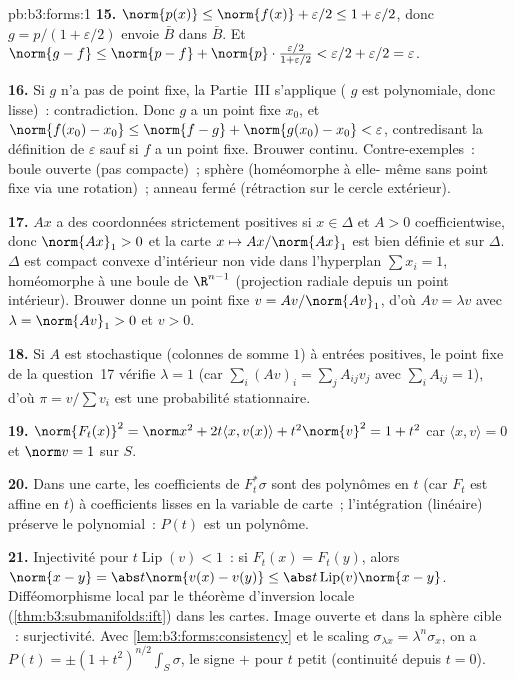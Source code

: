 \begin{solution}{pb:b3:forms:1}
\textbf{15.} $\norm{p(x)} \leq \norm{f(x)} + \varepsilon/2
\leq 1 + \varepsilon/2$, donc $g = p/(1+\varepsilon/2)$
envoie $\bar B$ dans $\bar B$. Et $\norm{g-f} \leq
\norm{p-f} + \norm{p}\cdot\frac{\varepsilon/2}{1+\varepsilon/2}
< \varepsilon/2 + \varepsilon/2 = \varepsilon$.

\textbf{16.} Si $g$ n'a pas de point fixe, la Partie~III
s'applique ( $g$ est polynomiale, donc lisse)~:
contradiction. Donc $g$ a un point fixe $x_0$, et
$\norm{f(x_0)-x_0} \leq \norm{f-g} + \norm{g(x_0)-x_0} <
\varepsilon$, contredisant la définition de $\varepsilon$
sauf si $f$ a un point fixe. Brouwer continu. Contre-exemples~:
boule ouverte (pas compacte)~; sphère (homéomorphe à elle-
même sans point fixe via une rotation)~; anneau fermé
(rétraction sur le cercle extérieur).

\textbf{17.} $Ax$ a des coordonnées strictement positives
si $x \in \Delta$ et $A > 0$ coefficientwise, donc
$\norm{Ax}_1 > 0$ et la carte $x \mapsto Ax/\norm{Ax}_1$
est bien définie et  sur $\Delta$. $\Delta$ est
compact convexe d'intérieur non vide dans l'hyperplan
$\sum x_i = 1$, homéomorphe à une boule  de
$\R^{n-1}$ (projection radiale depuis un point intérieur).
Brouwer donne un point fixe $v = Av/\norm{Av}_1$, d'où $Av
= \lambda v$ avec $\lambda = \norm{Av}_1 > 0$ et $v > 0$.

\textbf{18.} Si $A$ est stochastique (colonnes de somme
$1$) à entrées positives, le point fixe de la question~17
vérifie $\lambda = 1$ (car $\sum_i(Av)_i = \sum_j A_{ij}
v_j$ avec $\sum_i A_{ij} = 1$), d'où $\pi = v/\sum v_i$
est une probabilité stationnaire.

\textbf{19.} $\norm{F_t(x)}^2 = \norm x^2 + 2t\langle x,
v(x)\rangle + t^2\norm{v}^2 = 1 + t^2$ car $\langle x,v
\rangle = 0$ et $\norm v = 1$ sur $S$.

\textbf{20.} Dans une carte, les coefficients de
$F_t^*\sigma$ sont des polynômes en $t$ (car $F_t$ est
affine en $t$) à coefficients lisses en la variable de
carte~; l'intégration (linéaire) préserve le 
polynomial~: $P(t)$ est un polynôme.

\textbf{21.} Injectivité pour $t\operatorname{Lip}(v) <
1$~: si $F_t(x) = F_t(y)$, alors $\norm{x-y} =
\abs t\norm{v(x)-v(y)} \leq \abs t\operatorname{Lip}(v)
\norm{x-y}$. Difféomorphisme local par le théorème
d'inversion locale (\cref{thm:b3:submanifolds:ift}) dans
les cartes. Image ouverte et  dans la sphère cible
~: surjectivité. Avec
\cref{lem:b3:forms:consistency} et le scaling
$\sigma_{\lambda x} = \lambda^n\sigma_x$, on a $P(t) =
\pm(1+t^2)^{n/2}\int_S\sigma$, le signe $+$ pour $t$ petit
(continuité depuis $t = 0$).


\end{solution}
